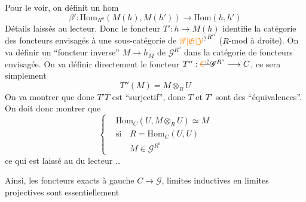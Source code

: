 Pour le voir, on définit un hom
\[
 \beta':\mathrm{Hom}_{R^o}(M(h),M(h'))\longrightarrow\mathrm{Hom}(h,h')
\]
Détails laissés au lecteur. Donc le foncteur $T':h\longrightarrow M(h)$ identifie la catégorie des foncteurs  envisagés à une sous-catégorie de $\unsure{\mathscr G|\mathfrak G|\mathcal Y}^{R^o}$ ($R$-mod à droite). On va définir un ``foncteur inverse'' $M\longrightarrow h_M$ de $\mathscr G^{R^o}$ dans la catégorie de foncteurs envisagée. On va définir directement le foncteur $T'':\deleted{\unsure{C}}\mathscr G^{R^o}\longrightarrow C$, ce sera simplement
\[
 T''(M)=M\otimes_R U
\]
On va montrer que   donc $T'T$ est ``surjectif'', donc $T$ et $T'$ sont des ``équivalences''. On doit donc montrer que
\[
 \left\{\begin{aligned}
 &\mathrm{Hom}_C(U,M\otimes_R U)\simeq M\\
 &\text{si}\quad R=\mathrm{Hom}_C(U,U)\\
 &\phantom{\text{si}\quad} M\in\mathscr G^{R^o}
 \end{aligned}\right.
\]
ce qui est laissé au  du lecteur \ldots

 Ainsi, les foncteurs   exacts à gauche $C\longrightarrow\mathscr G$,  limites inductives en limites projectives sont essentiellement 

